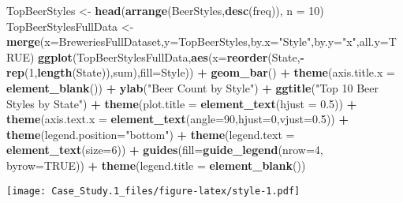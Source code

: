 \documentclass[]{article}
\newenvironment{Shaded}{\begin{snugshade}}{\end{snugshade}}
\newcommand{\DataTypeTok}[1]{\textcolor[rgb]{0.13,0.29,0.53}{#1}}
\newcommand{\DecValTok}[1]{\textcolor[rgb]{0.00,0.00,0.81}{#1}}
\newcommand{\FloatTok}[1]{\textcolor[rgb]{0.00,0.00,0.81}{#1}}
\newcommand{\KeywordTok}[1]{\textcolor[rgb]{0.13,0.29,0.53}{\textbf{#1}}}
\newcommand{\NormalTok}[1]{#1}
\newcommand{\OperatorTok}[1]{\textcolor[rgb]{0.81,0.36,0.00}{\textbf{#1}}}
\newcommand{\OtherTok}[1]{\textcolor[rgb]{0.56,0.35,0.01}{#1}}
\newcommand{\StringTok}[1]{\textcolor[rgb]{0.31,0.60,0.02}{#1}}
\begin{document}
\begin{Shaded}
\begin{Highlighting}[]
\NormalTok{TopBeerStyles <-}\StringTok{ }\KeywordTok{head}\NormalTok{(}\KeywordTok{arrange}\NormalTok{(BeerStyles,}\KeywordTok{desc}\NormalTok{(freq)), }\DataTypeTok{n =} \DecValTok{10}\NormalTok{)}
\NormalTok{TopBeerStylesFullData <-}\StringTok{ }\KeywordTok{merge}\NormalTok{(}\DataTypeTok{x=}\NormalTok{BreweriesFullDataset,}\DataTypeTok{y=}\NormalTok{TopBeerStyles,}\DataTypeTok{by.x=}\StringTok{"Style"}\NormalTok{,}\DataTypeTok{by.y=}\StringTok{"x"}\NormalTok{,}\DataTypeTok{all.y=}\OtherTok{TRUE}\NormalTok{)}
\KeywordTok{ggplot}\NormalTok{(TopBeerStylesFullData,}\KeywordTok{aes}\NormalTok{(}\DataTypeTok{x=}\KeywordTok{reorder}\NormalTok{(State,}\OperatorTok{-}\KeywordTok{rep}\NormalTok{(}\DecValTok{1}\NormalTok{,}\KeywordTok{length}\NormalTok{(State)),sum),}\DataTypeTok{fill=}\NormalTok{Style)) }\OperatorTok{+}\StringTok{ }\KeywordTok{geom_bar}\NormalTok{() }\OperatorTok{+}\StringTok{ }\KeywordTok{theme}\NormalTok{(}\DataTypeTok{axis.title.x =} \KeywordTok{element_blank}\NormalTok{())  }\OperatorTok{+}\StringTok{ }\KeywordTok{ylab}\NormalTok{(}\StringTok{"Beer Count by Style"}\NormalTok{) }\OperatorTok{+}\StringTok{ }\KeywordTok{ggtitle}\NormalTok{(}\StringTok{"Top 10 Beer Styles by State"}\NormalTok{) }\OperatorTok{+}\StringTok{ }\KeywordTok{theme}\NormalTok{(}\DataTypeTok{plot.title =} \KeywordTok{element_text}\NormalTok{(}\DataTypeTok{hjust =} \FloatTok{0.5}\NormalTok{)) }\OperatorTok{+}\StringTok{ }\KeywordTok{theme}\NormalTok{(}\DataTypeTok{axis.text.x =} \KeywordTok{element_text}\NormalTok{(}\DataTypeTok{angle=}\DecValTok{90}\NormalTok{,}\DataTypeTok{hjust=}\DecValTok{0}\NormalTok{,}\DataTypeTok{vjust=}\FloatTok{0.5}\NormalTok{)) }\OperatorTok{+}\StringTok{ }\KeywordTok{theme}\NormalTok{(}\DataTypeTok{legend.position=}\StringTok{"bottom"}\NormalTok{) }\OperatorTok{+}\StringTok{ }\KeywordTok{theme}\NormalTok{(}\DataTypeTok{legend.text =} \KeywordTok{element_text}\NormalTok{(}\DataTypeTok{size=}\DecValTok{6}\NormalTok{)) }\OperatorTok{+}\StringTok{ }\KeywordTok{guides}\NormalTok{(}\DataTypeTok{fill=}\KeywordTok{guide_legend}\NormalTok{(}\DataTypeTok{nrow=}\DecValTok{4}\NormalTok{, }\DataTypeTok{byrow=}\OtherTok{TRUE}\NormalTok{)) }\OperatorTok{+}\StringTok{ }\KeywordTok{theme}\NormalTok{(}\DataTypeTok{legend.title =} \KeywordTok{element_blank}\NormalTok{())}
\end{Highlighting}
\end{Shaded}

\texttt{[image: Case\_Study.1\_files/figure-latex/style-1.pdf]}
\end{document}
